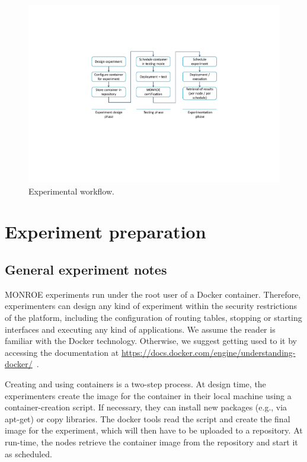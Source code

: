 \documentclass[a4paper,10pt]{article}
\newcommand{\monroe}{MONROE}
\begin{document}
\begin{figure}[tp]
	\centering
	\includegraphics[width=1.0\textwidth,trim={7cm 7.5cm 7cm 5cm}]{ExperimentWorkflow.pdf}
	\caption{Experimental workflow.}
	\label{fig:ExperimentWorkflow}
\end{figure}



\section{Experiment preparation}
\label{sec:experimentPreparation}


\subsection{General experiment notes}
\label{subsec:generalExperimentNotes}

\monroe{} experiments run under the root user of a Docker container.
Therefore, experimenters can design any kind of experiment within the security restrictions of the platform, including the configuration of routing tables, stopping or starting interfaces and executing any kind of applications.
We assume the reader is familiar with the Docker technology.
Otherwise, we suggest getting used to it by accessing the documentation at \url{https://docs.docker.com/engine/understanding-docker/}~.

Creating and using containers is a two-step process.
At design time, the experimenters create the image for the container in their local machine using a container-creation script.
If necessary, they can install new packages (e.g., via apt-get) or copy libraries.
The docker tools read the script and create the final image for the experiment, which will then have to be uploaded to a repository.
At run-time, the nodes retrieve the container image from the repository and start it as scheduled.
\end{document}
